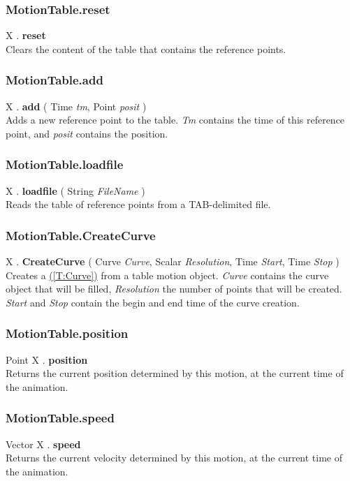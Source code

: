 \documentclass[10pt]{book}
\newcommand{\linkitem}[1]{\hyperref[#1]{\nameref{#1} (\ref{#1})}}
\newcommand{\var}[1]{\textit{#1}}
\begin{document}
\subsubsection{MotionTable.reset \label{F:MotionTable:reset}}
X . \textbf{reset} \\
Clears the content of the table that contains the reference points.

\subsubsection{MotionTable.add \label{F:MotionTable:add}}
X . \textbf{add} ( Time \textit{tm}, Point \textit{posit} ) \\
Adds a new reference point to the table. \var{Tm} contains the time of this reference point, and \var{posit} contains the position.

\subsubsection{MotionTable.loadfile \label{F:MotionTable:loadfile}}
X . \textbf{loadfile} ( String \textit{FileName} ) \\
Reads the table of reference points from a TAB-delimited file.

\subsubsection{MotionTable.CreateCurve \label{F:MotionTable:CreateCurve}}
X . \textbf{CreateCurve} ( Curve \textit{Curve}, Scalar \textit{Resolution}, Time \textit{Start}, Time \textit{Stop} ) \\
Creates a \linkitem{T:Curve} from a table motion object. \var{Curve} contains the curve object that will be filled, \var{Resolution} the number of points that will be created. \var{Start} and \var{Stop} contain the begin and end time of the curve creation.

\subsubsection{MotionTable.position \label{F:MotionTable:position}}
Point X . \textbf{position} \\
Returns the current position determined by this motion, at the current time of the animation.

\subsubsection{MotionTable.speed \label{F:MotionTable:speed}}
Vector X . \textbf{speed} \\
Returns the current velocity determined by this motion, at the current time of the animation.
\end{document}

